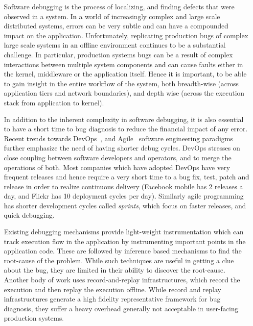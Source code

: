 Software debugging is the process of localizing, and finding defects that were observed in a system.
In a world of increasingly complex and large scale distributed systems, errors can be very subtle and can have a compounded impact on the application.
Unfortunately, replicating production bugs of complex large scale systems in an offline environment continues to be a substantial challenge.
In particular, production systems bugs can be a result of complex interactions between multiple system components and can cause faults either in the kernel, middleware or the application itself.
Hence it is important, to be able to gain insight in the entire workflow of the system, both breadth-wise (across application tiers and network boundaries), and depth wise (across the execution stack from application to kernel).

In addition to the inherent complexity in software debugging, it is also essential to have a short time to bug diagnosis to reduce the financial impact of any error.
Recent trends towards DevOps~\cite{devops}, and Agile~\cite{agile} software engineering paradigms further emphasize the need of having shorter debug cycles.
DevOps stresses on close coupling between software developers and operators, and to merge the operations of both.
Most companies which have adopted DevOps have very frequent releases and hence require a very short time to a bug fix, test, patch and release in order to realize continuous delivery (Facebook mobile has 2 releases a day, and Flickr has 10 deployment cycles per day).
Similarly agile programming has shorter development cycles called \textit{sprints}, which focus on faster releases, and quick debugging.

Existing debugging mechanisms provide light-weight instrumentation which can track execution flow in the application by instrumenting important points in the application code.
These are followed by inference based mechanisms to find the root-cause of the problem.
While such techniques are useful in getting a clue about the bug, they are limited in their ability to discover the root-cause.
Another body of work uses record-and-replay infrastructures, which record the execution and then replay the execution offline.
While record and replay infrastructures generate a high fidelity representative framework for bug diagnosis, they suffer a heavy overhead generally not acceptable in user-facing production systems.

